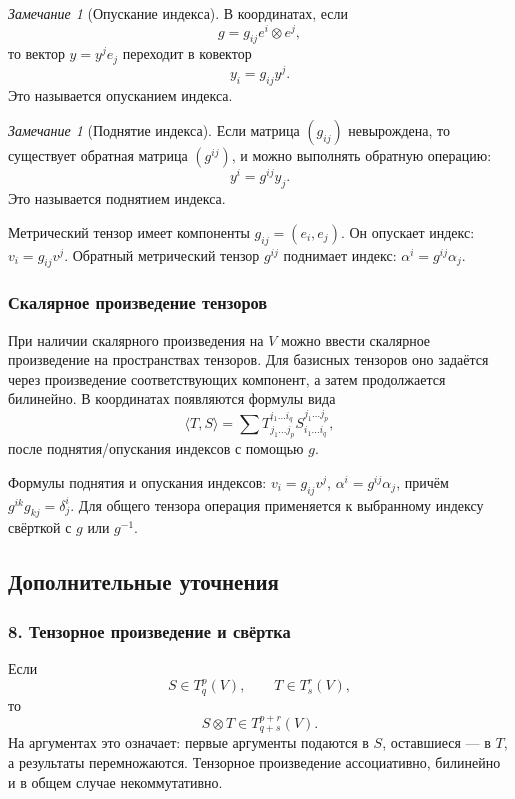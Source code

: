 \documentclass[12pt,a4paper]{article}
\theoremstyle{definition}
\theoremstyle{plain}
\theoremstyle{remark}
\newtheorem{remark}[definition]{Замечание}
\newenvironment{knowledgefix}{\begin{clarifybox}}{\end{clarifybox}}
\begin{document}
\begin{remark}[Опускание индекса]
В координатах, если
\[
    g=g_{ij}e^i\otimes e^j,
\]
то вектор $y=y^j e_j$ переходит в ковектор
\[
    y_i=g_{ij}y^j.
\]
Это называется опусканием индекса.
\end{remark}

\begin{remark}[Поднятие индекса]
Если матрица $(g_{ij})$ невырождена, то существует обратная матрица $(g^{ij})$, и можно выполнять обратную операцию:
\[
    y^i=g^{ij}y_j.
\]
Это называется поднятием индекса.
\begin{knowledgefix}
Метрический тензор имеет компоненты \(g_{ij}=(e_i,e_j)\). Он опускает индекс: \(v_i=g_{ij}v^j\). Обратный метрический тензор \(g^{ij}\) поднимает индекс: \(\alpha^i=g^{ij}\alpha_j\).
\end{knowledgefix}
\end{remark}

\subsubsection*{Скалярное произведение тензоров}

При наличии скалярного произведения на $V$ можно ввести скалярное произведение на пространствах тензоров. Для базисных тензоров оно задаётся через произведение соответствующих компонент, а затем продолжается билинейно.
В координатах появляются формулы вида
\[
    \langle T,S\rangle
    =
    \sum T^{i_1\ldots i_q}_{j_1\ldots j_p}
          S^{j_1\ldots j_p}_{i_1\ldots i_q},
\]
после поднятия/опускания индексов с помощью $g$.
\begin{knowledgefix}
Формулы поднятия и опускания индексов: \(v_i=g_{ij}v^j\), \(\alpha^i=g^{ij}\alpha_j\), причём \(g^{ik}g_{kj}=\delta^i_j\). Для общего тензора операция применяется к выбранному индексу свёрткой с \(g\) или \(g^{-1}\).
\end{knowledgefix}

\subsection*{Дополнительные уточнения}

\subsubsection*{8. Тензорное произведение и свёртка}
Если
\[
    S\in T^p_q(V),
    \qquad
    T\in T^r_s(V),
\]
то
\[
    S\otimes T\in T^{p+r}_{q+s}(V).
\]
На аргументах это означает: первые аргументы подаются в $S$, оставшиеся --- в $T$, а результаты перемножаются.
Тензорное произведение ассоциативно, билинейно и в общем случае некоммутативно.
\end{document}
